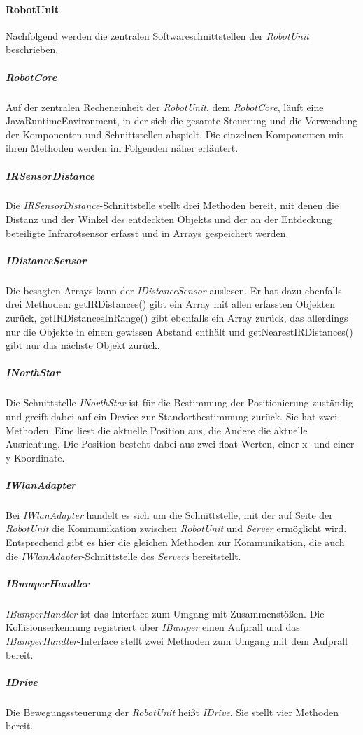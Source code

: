     \paragraph{RobotUnit}\label{robotunit}
    		Nachfolgend werden die zentralen Softwareschnittstellen der \emph{RobotUnit} beschrieben.
    	\subparagraph{RobotCore}\label{robotcore}
    		Auf der zentralen Recheneinheit der \emph{RobotUnit}, dem \emph{RobotCore}, läuft eine JavaRuntimeEnvironment, in der sich die gesamte Steuerung und die Verwendung der Komponenten und Schnittstellen abspielt.
    		Die einzelnen Komponenten mit ihren Methoden werden im Folgenden näher erläutert.
    	\subparagraph{IRSensorDistance}\label{irsensordistance}
    		Die \emph{IRSensorDistance}-Schnittstelle stellt drei Methoden bereit, mit denen die Distanz und der Winkel des entdeckten Objekts und der an der Entdeckung beteiligte Infrarotsensor erfasst und in Arrays gespeichert werden.
    	\subparagraph{IDistanceSensor}\label{idistancesensor}
    		Die besagten Arrays kann der \emph{IDistanceSensor} auslesen.
    		Er hat dazu ebenfalls drei Methoden: getIRDistances() gibt ein Array mit allen erfassten Objekten zurück, getIRDistancesInRange() gibt ebenfalls ein Array zurück, das allerdings nur die Objekte in einem gewissen Abstand enthält und getNearestIRDistances() gibt nur das nächste Objekt zurück.
    	\subparagraph{INorthStar}\label{inorthstar}
    		Die Schnittstelle \emph{INorthStar} ist für die Bestimmung der Positionierung zuständig und greift dabei auf ein Device zur Standortbestimmung zurück.
    		Sie hat zwei Methoden.
    		Eine liest die aktuelle Position aus, die Andere die aktuelle Ausrichtung.
    		Die Position besteht dabei aus zwei float-Werten, einer x- und einer y-Koordinate.
    	\subparagraph{IWlanAdapter}\label{iwlanadapter}
    		Bei \emph{IWlanAdapter} handelt es sich um die Schnittstelle, mit der auf Seite der \emph{RobotUnit} die Kommunikation zwischen \emph{RobotUnit} und \emph{Server} ermöglicht wird.
    		Entsprechend gibt es hier die gleichen Methoden zur Kommunikation, die auch die \emph{IWlanAdapter}-Schnittstelle des \emph{Servers} bereitstellt.
    	\subparagraph{IBumperHandler}\label{ibumperhandler}
    		\emph{IBumperHandler} ist das Interface zum Umgang mit Zusammenstößen.
    		Die Kollisionserkennung registriert über \emph{IBumper} einen Aufprall und das \emph{IBumperHandler}-Interface stellt zwei Methoden zum Umgang mit dem Aufprall bereit.
    	\subparagraph{IDrive}\label{idrive}
    		Die Bewegungssteuerung der \emph{RobotUnit} heißt \emph{IDrive}.
    		Sie stellt vier Methoden bereit.

